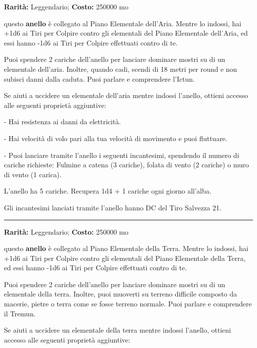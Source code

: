 \begin{multicols}{2}
\textbf{Rarità:} Leggendario; \textbf{Costo:} 250000 mo

questo \textbf{anello} è collegato al Piano Elementale dell'Aria. Mentre lo indossi, hai +1d6 ai Tiri per Colpire contro gli elementali del Piano Elementale dell'Aria, ed essi hanno -1d6 ai Tiri per Colpire effettuati contro di te.

Puoi spendere 2 cariche dell'anello per lanciare dominare mostri su di un elementale dell'aria. Inoltre, quando cadi, scendi di 18 metri per round e non subisci danni dalla caduta. Puoi parlare e comprendere l'Ictun.

Se aiuti a uccidere un elementale dell'aria mentre indossi l'anello, ottieni accesso alle seguenti proprietà aggiuntive:

\smallskip- Hai resistenza ai danni da elettricità.

\smallskip- Hai velocità di volo pari alla tua velocità di movimento e puoi fluttuare.

\smallskip- Puoi lanciare tramite l'anello i seguenti incantesimi, spendendo il numero di cariche richieste: Fulmine a catena (3 cariche), folata di vento (2 cariche) o muro di vento (1 carica).

\medskip

L'anello ha 5 cariche. Recupera 1d4 + 1 cariche ogni giorno all'alba.

Gli incantesimi lanciati tramite l'anello hanno DC del Tiro Salvezza 21.

\smallskip\noindent\rule{\linewidth}{2pt}  \hypertarget{AnellodegliElementalidellaTerra}{}\smallskip{}\noindent\label{AnellodegliElementalidellaTerra}

\textbf{Rarità:} Leggendario; \textbf{Costo:} 250000 mo

questo \textbf{anello} è collegato al Piano Elementale della Terra. Mentre lo indossi, hai +1d6 ai Tiri per Colpire contro gli elementali del Piano Elementale della Terra, ed essi hanno -1d6 ai Tiri per Colpire effettuati contro di te.

Puoi spendere 2 cariche dell'anello per lanciare dominare mostri su di un elementale della terra. Inoltre, puoi muoverti su terreno difficile composto da macerie, pietre o terra come se fosse terreno normale. Puoi parlare e comprendere il Tremun.

Se aiuti a uccidere un elementale della terra mentre indossi l'anello, ottieni accesso alle seguenti proprietà aggiuntive:


\end{multicols}
